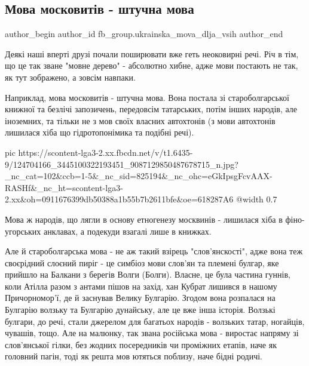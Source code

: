  
 
 
 
 
 
\subsection{Мова московитів - штучна мова}
\label{sec:09_11_2020.fb.fb_group.ukrainska_mova_dlja_vsih.1.jazyk_moskovity_mova}
 
\ifcmt
 author_begin
   author_id fb_group.ukrainska_mova_dlja_vsih
 author_end
\fi

Деякі наші вперті друзі почали поширювати вже геть неоковирні речі. Річ в тім,
що це так зване "мовне дерево" - абсолютно хибне, адже мови постають не так, як
тут зображено, а зовсім навпаки.

Наприклад, мова московитів - штучна мова. Вона постала зі староболгарської
книжної та безлічі запозичень, передовсім татарських, потім інших народів, але
іноземних, та тільки не з мов своїх власних автохтонів (з мови автохтонів
лишилася хіба що гідротопонімика та подібні речі).

\ifcmt
  pic https://scontent-lga3-2.xx.fbcdn.net/v/t1.6435-9/124704166_3445100322193451_9087129850487678715_n.jpg?_nc_cat=102&ccb=1-5&_nc_sid=825194&_nc_ohc=eGkIpsgFcvAAX-RASHf&_nc_ht=scontent-lga3-2.xx&oh=0911676399db50388a1b55b7b2611bfe&oe=618287A6
  @width 0.7
\fi

Мова ж народів, що лягли в основу етногенезу москвинів - лишилася хіба в
фіно-угорських анклавах, а подекуди взагалі лише в книжках.

Але й староболгарська мова - не аж такий взірець "слов'янскості", адже вона теж
своєрідний слоєний пиріг - це симбіоз мови слов'ян та племені булгар, яке
прийшло на Балкани з берегів Волги (Болги). Власне, це була частина гуннів,
коли Атілла разом з антами пішов на захід, хан Кубрат лишився в нашому
Причорномор'ї, де й заснував Велику Булгарію. Згодом вона розпалася на Булгарію
волзьку та Булгарію дунайську, але це вже інша історія. Волзькі булгари, до
речі, стали джерелом для багатьох народів - волзьких татар, ногайців, чувашів,
тощо. Але на малюнку, так звана російська мова - виростає напряму зі
слов'янської гілки, без жодних посередників чи проміжних етапів, наче як
головний пагін, тоді як решта мов ютяться поблизу, наче бідні родичі.

